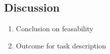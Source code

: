 \documentclass{article}
\begin{document}
\begin{sloppy}
\section{Discussion}
\label{sec:pagestyle}

\begin{enumerate}
\item Conclusion on feasability
\item Outcome for task description
\end{enumerate}



%
% 
%
%
%
% 
%
% 
% 


\end{sloppy}
\end{document}
